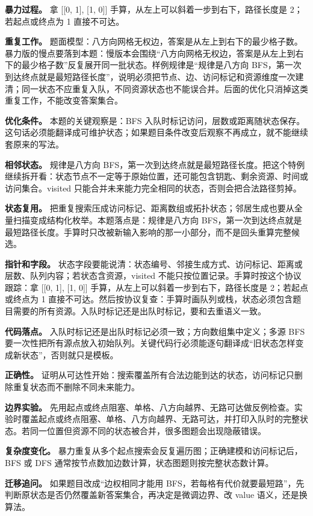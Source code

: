 \textbf{暴力过程。} 拿 [[0, 1], [1, 0]] 手算，从左上可以斜着一步到右下，路径长度是 2；若起点或终点为 1 直接不可达。

\textbf{重复工作。} 题面模型：八方向网格无权边，答案是从左上到右下的最少格子数。暴力版的慢点要落到本题：慢版本会围绕“八方向网格无权边，答案是从左上到右下的最少格子数”反复展开同一批状态。样例规律是“规律是八方向 BFS，第一次到达终点就是最短路径长度”，说明必须把节点、边、访问标记和资源维度一次建清；同一状态不应重复入队，不同资源状态也不能误合并。后面的优化只消掉这类重复工作，不能改变答案集合。

\textbf{优化条件。} 本题的关键观察是：BFS 入队时标记访问，层数或距离随状态保存。这句话必须能翻译成可维护状态；如果题目条件改变后观察不再成立，就不能继续套原来的写法。

\textbf{相邻状态。} 规律是八方向 BFS，第一次到达终点就是最短路径长度。把这个特例继续拆开看：状态节点不一定等于原始位置，还可能包含钥匙、剩余资源、时间或访问集合。visited 只能合并未来能力完全相同的状态，否则会把合法路径剪掉。

\textbf{状态复用。} 把重复搜索压成访问标记、距离数组或拓扑状态；邻居生成也要从全量扫描变成结构化枚举。本题落点是：规律是八方向 BFS，第一次到达终点就是最短路径长度。手算时只改被新输入影响的那一小部分，而不是回头重算完整候选。

\textbf{指针和字段。} 状态字段要能说清：状态编号、邻接生成方式、访问标记、距离或层数、队列内容；若状态含资源，visited 不能只按位置记录。手算时按这个协议跟踪：拿 [[0, 1], [1, 0]] 手算，从左上可以斜着一步到右下，路径长度是 2；若起点或终点为 1 直接不可达。然后按协议复查：手算时画队列或栈，状态必须包含题目需要的所有资源。入队时标记还是出队时标记，要和去重语义一致。

\textbf{代码落点。} 入队时标记还是出队时标记必须一致；方向数组集中定义；多源 BFS 要一次性把所有源点放入初始队列。关键代码行必须能逐句翻译成“旧状态怎样变成新状态”，否则就只是模板。

\textbf{正确性。} 证明从可达性开始：搜索覆盖所有合法边能到达的状态，访问标记只删除重复状态而不删除不同未来能力。

\textbf{边界实验。} 先用起点或终点阻塞、单格、八方向越界、无路可达做反例检查。实验时覆盖起点或终点阻塞、单格、八方向越界、无路可达，并打印入队时的完整状态。若同一位置但资源不同的状态被合并，很多图题会出现隐蔽错误。

\textbf{复杂度变化。} 暴力重复从多个起点搜索会反复遍历图；正确建模和访问标记后，BFS 或 DFS 通常按节点数加边数计算，状态图题则按完整状态数计算。

\textbf{迁移追问。} 如果题目改成“边权相同才能用 BFS，若每格有代价就要最短路”，先判断原状态是否仍然覆盖新答案集合，再决定是微调边界、改 value 语义，还是换算法。

